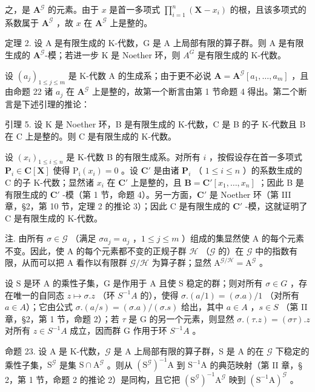 之，是 \(\mathbf{A}^{\mathcal{G}}\) 的元素。由于 \(x\) 是首一多项式 \(\prod_{i=1}^{n} (\mathbf{X} - x_i)\) 的根，且该多项式的系数属于 \(\mathbf{A}^{\mathcal{G}}\) ，故 \(x\) 在 \(\mathbf{A}^{\mathcal{G}}\) 上是整的。

定理 2. 设 A 是有限生成的 K-代数，G 是 A 上局部有限的算子群。则 A 是有限生成的 \(\mathbf{A}^{\mathcal{G}}\)-模；若进一步 K 是 Noether 环，则 \(A^{G}\) 是有限生成的 K-代数。

设 \((a_{j})_{1\leqslant j\leqslant m}\) 是 K-代数 A 的生成系；由于更不必说 \(\mathbf{A} = \mathbf{A}^{\mathcal{G}}[a_1,\ldots ,a_m]\) ，且由命题 22 诸 \(a_{j}\) 在 \(\mathbf{A}^{\mathcal{G}}\) 上是整的，故第一个断言由第 1 节命题 4 得出。第二个断言是下述引理的推论：

引理 5. 设 K 是 Noether 环，B 是有限生成的 K-代数，C 是 B 的子 K-代数且 B 在 C 上是整的。则 C 是有限生成的 K-代数。

设 \((x_{i})_{1\leqslant i\leqslant n}\) 是 K-代数 B 的有限生成系。对所有 \(i\) ，按假设存在首一多项式 \(\mathbf{P}_i\in \mathbf{C}[\mathbf{X}]\) 使得 \(\mathrm{P_i}(x_i) = 0\) 。设 \(\mathbf{C}'\) 是由诸 \(\mathbf{P}_i\) （ \(1\leqslant i\leqslant n\) ）的系数生成的 C 的子 K-代数；显然诸 \(x_{i}\) 在 \(\mathbf{C}'\) 上是整的，且 \(\mathbf{B} = \mathbf{C}'[x_1,\dots,x_n]\) ；因此 B 是有限生成的 \(\mathbf{C}'\) -模（第 1 节，命题 4）。另一方面，\(\mathbf{C}'\) 是 Noether 环（第 III 章，§2，第 10 节，定理 2 的推论 3）；因此 C 是有限生成的 \(\mathbf{C}'\) -模，这就证明了 C 是有限生成的 K-代数。

注. 由所有 \(\sigma \in \mathcal{G}\) （满足 \(\sigma a_{j} = a_{j}\) ，\(1 \leqslant j \leqslant m\) ）组成的集显然使 A 的每个元素不变。因此，使 A 的每个元素都不变的正规子群 \(\mathcal{H}\) （\(\mathcal{G}\) 的）在 \(\mathcal{G}\) 中的指数有限，从而可以把 A 看作以有限群 \(\mathcal{G}/\mathcal{H}\) 为算子群；显然 \(\mathrm{A}^{\mathcal{G}/\mathcal{H}} = \mathrm{A}^{\mathcal{G}}\) 。

设 S 是环 A 的乘性子集，G 是作用于 A 且使 S 稳定的群；则对所有 \(\sigma\in G\) ，存在唯一的自同态 \(z\mapsto\sigma.z\) （环 \(S^{-1}A\) 的），使得 \(\sigma.(a/1)=(\sigma.a)/1\) （对所有 \(a\in A\)）；它由公式 \(\sigma.(a/s)=(\sigma.a)/( \sigma.s)\) 给出，其中 \(a\in A\) ，\(s\in S\) （第 II 章，§2，第 1 节，命题 2）；若 \(\tau\) 是 G 的另一个元素，则显然 \(\sigma.(\tau.z)=(\sigma\tau).z\) 对所有 \(z\in S^{-1}A\) 成立，因而群 G 作用于环 \(S^{-1}A\) 。

命题 23. 设 A 是 K-代数，\(\mathcal{G}\) 是 A 上局部有限的算子群，S 是 A 的在 \(\mathcal{G}\) 下稳定的乘性子集，\(\mathrm{S}^{\mathcal{G}}\) 是集 \(\mathrm{S} \cap \mathrm{A}^{\mathcal{G}}\) 。则从 \((\mathrm{S}^{\mathcal{G}})^{-1}\mathrm{A}\) 到 \(\mathrm{S}^{-1}\mathrm{A}\) 的典范映射（第 II 章，§ 2，第 1 节，命题 2 的推论 2）是同构，且它把 \((\mathrm{S}^{\mathcal{G}})^{-1}\mathrm{A}^{\mathcal{G}}\) 映到 \((\mathrm{S}^{-1}\mathrm{A})^{\mathcal{G}}\) 。

